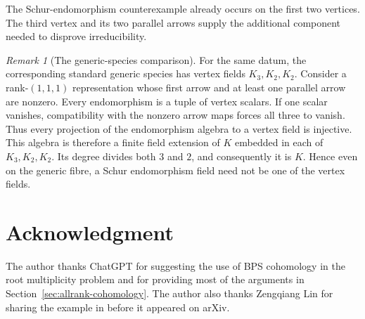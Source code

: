 \documentclass[11pt, reqno]{amsart}
\numberwithin{equation}{section}
\theoremstyle{definition}
\theoremstyle{remark}
\newtheorem{remark}[theorem]{Remark}
\begin{document}
The Schur-endomorphism counterexample already occurs on the first
two vertices. The third vertex and its two parallel arrows supply
the additional component needed to disprove irreducibility.

\begin{remark}[The generic-species comparison]
For the same datum, the corresponding standard generic species
has vertex fields $K_3,K_2,K_2$. Consider a rank-$(1,1,1)$ representation
whose first arrow and at least one parallel arrow are nonzero.
Every endomorphism is a tuple of vertex scalars. If one scalar
vanishes, compatibility with the nonzero arrow maps forces all
three to vanish. Thus every projection of the endomorphism
algebra to a vertex field is injective. This algebra is therefore
a finite field extension of $K$ embedded in each of $K_3,K_2,K_2$.
Its degree divides both $3$ and $2$, and consequently it is $K$.
Hence even on the generic fibre, a Schur endomorphism field need
not be one of the vertex fields.
\end{remark}


\section*{Acknowledgment}
The author thanks ChatGPT for suggesting the use of BPS cohomology
in the root multiplicity problem and for providing most of the
arguments in Section~\ref{sec:allrank-cohomology}.
The author also thanks Zengqiang Lin for sharing the example in
\cite{LinSu} before it appeared on arXiv.
\end{document}
